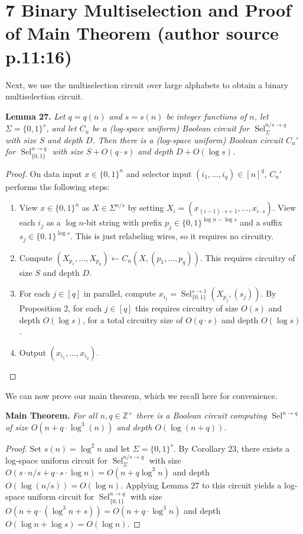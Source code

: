 \documentclass[10pt,a4paper]{article}
\newcommand{\Sel}{\operatorname{Sel}}
\newcommand{\bits}{\{0,1\}}
\newcommand{\ZZ}{\mathbb Z}
\newenvironment{originalresult}[1]{\par\medskip\noindent\textbf{#1.}\itshape}{\par\medskip}
\begin{document}
\section*{7 Binary Multiselection and Proof of Main Theorem (author source p.11:16)}
Next, we use the multiselection circuit over large alphabets to obtain a binary multiselection circuit.
\begin{originalresult}{Lemma 27}
Let $q=q(n)$ and $s=s(n)$ be integer functions of $n$, let $\Sigma=\bits^s$, and let $C_n$ be a (log-space uniform) Boolean circuit for $\Sel_\Sigma^{n/s\to q}$ with size $S$ and depth $D$.
Then there is a (log-space uniform) Boolean circuit $C_n'$ for $\Sel_{\{0,1\}}^{n\to q}$ with size $S+O(q\cdot s)$ and depth $D+O(\log s)$.
\end{originalresult}
\begin{proof}
On data input $x\in\bits^n$ and selector input $(i_1,\ldots,i_q)\in[n]^q$, $C_n'$ performs the following steps:
\begin{enumerate}
\item View $x\in\bits^n$ as $X\in\Sigma^{n/s}$ by setting $X_i=(x_{(i-1)\cdot s+1},\ldots,x_{i\cdot s})$. View each $i_j$ as a $\log n$-bit string with prefix $p_j\in\bits^{\log n-\log s}$ and a suffix $s_j\in\bits^{\log s}$. This is just relabeling wires, so it requires no circuitry.
\item Compute $(X_{p_1},\ldots,X_{p_q})\leftarrow C_n(X,(p_1,\ldots,p_q))$. This requires circuitry of size $S$ and depth $D$.
\item For each $j\in[q]$ in parallel, compute $x_{i_j}=\Sel_{\{0,1\}}^{s\to1}(X_{p_j},(s_j))$. By Proposition 2, for each $j\in[q]$ this requires circuitry of size $O(s)$ and depth $O(\log s)$, for a total circuitry size of $O(q\cdot s)$ and depth $O(\log s)$.
\item Output $(x_{i_1},\ldots,x_{i_q})$.
\end{enumerate}
\end{proof}
We can now prove our main theorem, which we recall here for convenience.

\begin{originalresult}{Main Theorem}
For all $n,q\in\ZZ^+$ there is a Boolean circuit computing $\Sel^{n\to q}$ of size $O(n+q\cdot\log^3(n))$ and depth $O(\log(n+q))$.
\end{originalresult}

\begin{proof}
Set $s(n)=\log^2n$ and let $\Sigma=\bits^s$. By Corollary 23, there exists a log-space uniform circuit for $\Sel_\Sigma^{n/s\to q}$ with size $O(s\cdot n/s+q\cdot s\cdot\log n)=O(n+q\log^3n)$ and depth $O(\log(n/s))=O(\log n)$. Applying Lemma 27 to this circuit yields a log-space uniform circuit for $\Sel_{\{0,1\}}^{n\to q}$ with size $O(n+q\cdot(\log^3n+s))=O(n+q\cdot\log^3n)$ and depth $O(\log n+\log s)=O(\log n)$.
\end{proof}
\end{document}
